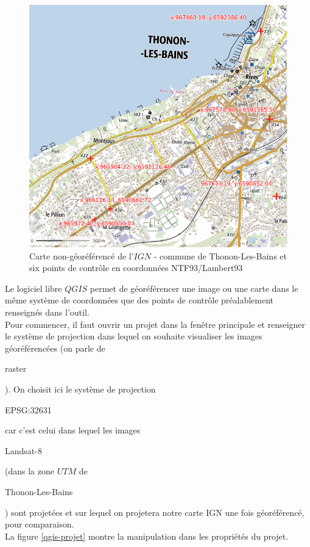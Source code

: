 \documentclass{book}
\begin{document}
\begin{figure}[H]
\begin{center}
\includegraphics[scale=0.5]{images/georeferencing/ign-points-Thonon.png}
\end{center}
\caption{Carte non-géoréférencé de l'$IGN$ - commune de Thonon-Les-Bains et six points de contr\^{o}le en coordonnées NTF93/Lambert93}
\label{ign-points}
\end{figure}

\clearpage

Le logiciel libre $QGIS$ \cite{QGIS_software} permet de géoréférencer une image ou une carte dans le même système de coordonnées que des points de
contr\^{o}le préalablement renseignés dans l'outil.\\
Pour commencer, il faut ouvrir un projet dans la fen\^{e}tre principale et renseigner le système de projection dans lequel on souhaite visualiser
les images géoréférencées (on parle de \begin{itshape}raster\end{itshape}). On choisit ici le système de projection
\begin{itshape}EPSG:32631\end{itshape} car c'est celui dans lequel les images \begin{itshape}Landsat-8\end{itshape} (dans la zone $UTM$ 
de \begin{itshape}Thonon-Les-Bains\end{itshape}) sont projetées et
sur lequel on projetera notre carte IGN une fois géoréférencé, pour comparaison.\\
La figure \ref{qgis-projet} montre la manipulation dans les propriétés du projet.
\end{document}
